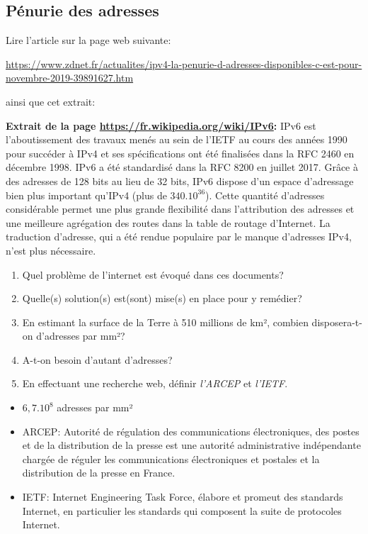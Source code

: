 \documentclass[a4paper,11pt]{article}
\begin{document}
\begin{Form}
\subsection{Pénurie des adresses}
Lire l'article sur la page web suivante:
\begin{center}
\url{https://www.zdnet.fr/actualites/ipv4-la-penurie-d-adresses-disponibles-c-est-pour-novembre-2019-39891627.htm}
\end{center}
ainsi que cet extrait:
\begin{framed}
\noindent\textbf{Extrait de la page \url{https://fr.wikipedia.org/wiki/IPv6}:} IPv6 est l'aboutissement des travaux menés au sein de l'IETF au cours des années 1990 pour succéder à IPv4 et ses spécifications ont été finalisées dans la RFC 2460 en décembre 1998. IPv6 a été standardisé dans la RFC 8200 en juillet 2017.
Grâce à des adresses de 128 bits au lieu de 32 bits, IPv6 dispose d'un espace d'adressage bien plus important qu'IPv4 (plus de $340.10^{36}$). Cette quantité d'adresses considérable permet une plus grande flexibilité dans l'attribution des adresses et une meilleure agrégation des routes dans la table de routage d'Internet. La traduction d'adresse, qui a été rendue populaire par le manque d'adresses IPv4, n'est plus nécessaire. 
\end{framed}
\begin{enumerate}
\item Quel problème de l'internet est évoqué dans ces documents?
\item Quelle(s) solution(s) est(sont) mise(s) en place pour y remédier?
\item En estimant la surface de la Terre à 510 millions de km², combien disposera-t-on d'adresses par mm²?
\item A-t-on besoin d'autant d'adresses?
\item En effectuant une recherche web, définir \emph{l'ARCEP} et \emph{l'IETF}.
\end{enumerate}
\begin{commentprof}
\begin{itemize}
\item $6,7.10^8$ adresses par mm²
\item ARCEP: Autorité de régulation des communications électroniques, des postes et de la distribution de la presse est une autorité administrative indépendante chargée de réguler les communications électroniques et postales et la distribution de la presse en France.
\item IETF: Internet Engineering Task Force, élabore et promeut des standards Internet, en particulier les standards qui composent la suite de protocoles Internet. 
\end{itemize}
\end{commentprof}

\end{Form}
\end{document}
